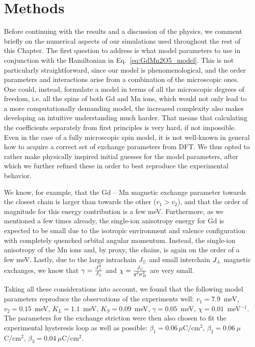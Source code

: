 \section{Methods \label{sec:GdMn2O5_methods}}
Before continuing with the results and a discussion of the physics, we comment briefly on the numerical aspects of our simulations used throughout the rest of this Chapter.
The first question to address is what model parameters to use in conjunction with the Hamiltonian in Eq.~\eqref{eq:GdMn2O5_model}.
This is not particularly straightforward, since our model is phenomenological, and the order parameters and interactions arise from a combination of the microscopic ones.
One could, instead, formulate a model in terms of all the microscopic degrees of freedom, i.e. all the spins of both Gd and Mn ions, which would not only lead to a more computationally demanding model, the increased complexity also makes developing an intuitive understanding much harder.
That means that calculating the coefficients separately from first principles is very hard, if not impossible. Even in the case of a fully microscopic spin model, it is not well-known in general how to acquire a correct set of exchange parameters from DFT.
We thus opted to rather make physically inspired initial guesses for the model parameters, after which we further refined these in order to best reproduce the experimental behavior.

We know, for example, that the Gd -- Mn magnetic exchange parameter towards the closest chain is larger than towards the other ($v_1>v_2$), and that the order of magnitude for this energy contribution is a few meV.
Furthermore, as we mentioned a few times already, the single-ion anisotropy energy for Gd is expected to be small due to the isotropic environment and valence configuration with completely quenched orbital angular momentum.
Instead, the single-ion anisotropy of the Mn ions and, by proxy, the chains, is again on the order of a few meV.
Lastly, due to the large intrachain $J_{||}$ and small interchain $J_{\perp}$ magnetic exchanges, we know that $\gamma = \frac{J_{\perp}^2}{J_{||}}$ and $\chi = \frac{J_{||}}{g^2\mu_B^2}$ are very small.

Taking all these considerations into account, we found that the following model parameters reproduce the observations of the experiments well:  
$v_1 = 7.9$~meV, $v_2 = 0.15$~meV, $K_L = 1.1$~meV, $K_S = 0.09$~meV, $\gamma = 0.05$~meV, $\chi=0.01$~meV$^{-1}$.
The parameters for the exchange striction were then also chosen to fit the experimental hysteresis loop as well as possible:
${\beta_1 = 0.06\,\mu}$C/cm$^2$, $\beta_2 = 0.06\:\mu$C/cm$^2$, $\beta_3 = 0.04\:\mu$C/cm$^2$.

